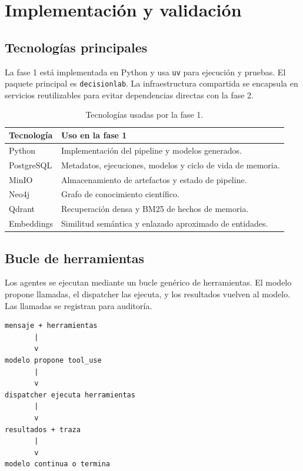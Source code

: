 \chapter{Implementación y validación}

\section{Tecnologías principales}

La fase 1 está implementada en Python y usa \texttt{uv} para ejecución y pruebas.
El paquete principal es \texttt{decisionlab}. La infraestructura compartida se
encapsula en servicios reutilizables para evitar dependencias directas con la
fase 2.

\begin{table}[H]
\begin{center}
\begin{tabular}{|l|p{9cm}|} \hline
\textbf{Tecnología} & \textbf{Uso en la fase 1} \\ \hline
Python & Implementación del pipeline y modelos generados. \\ \hline
PostgreSQL & Metadatos, ejecuciones, modelos y ciclo de vida de memoria. \\ \hline
MinIO & Almacenamiento de artefactos y estado de pipeline. \\ \hline
Neo4j & Grafo de conocimiento científico. \\ \hline
Qdrant & Recuperación densa y BM25 de hechos de memoria. \\ \hline
Embeddings & Similitud semántica y enlazado aproximado de entidades. \\ \hline
\end{tabular}
\caption{Tecnologías usadas por la fase 1.}
\end{center}
\end{table}

\section{Bucle de herramientas}

Los agentes se ejecutan mediante un bucle genérico de herramientas. El modelo
propone llamadas, el dispatcher las ejecuta, y los resultados vuelven al modelo.
Las llamadas se registran para auditoría.

\begin{verbatim}
mensaje + herramientas
       |
       v
modelo propone tool_use
       |
       v
dispatcher ejecuta herramientas
       |
       v
resultados + traza
       |
       v
modelo continua o termina
\end{verbatim}


